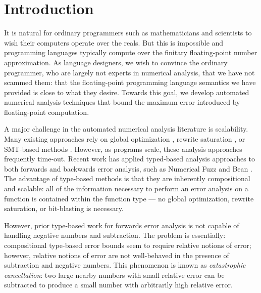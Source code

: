 \section{Introduction}
It is natural for ordinary programmers such as mathematicians and scientists to
wish their computers operate over the reals. 
But this is impossible and programming languages typically compute over the
finitary floating-point number approximation.
As language designers, we wish to convince the ordinary programmer, who are
largely not experts in numerical analysis, that we have not scammed them: that
the floating-point programming language semantics we have provided is close to
what they desire. 
Towards this goal, we develop automated numerical analysis techniques that bound
the maximum error introduced by floating-point computation.

A major challenge in the automated numerical analysis literature is scalability.
Many existing approaches rely on global optimization \cite{fptaylor} \cite{satire},
rewrite saturation \cite{gappa}, or SMT-based methods \cite{rosa}. 
However, as programs scale, these analysis approaches frequently time-out.
Recent work has applied typed-based analysis approaches to both forwards and
backwards error analysis, such as Numerical Fuzz \cite{numfuzz} and Bean \cite{bean}.
The advantage of type-based methods is that they are inherently compositional
and scalable: all of the information necessary to perform an error analysis on a
function is contained within the function type --- no global optimization,
rewrite saturation, or bit-blasting is necessary.

However, prior type-based work for forwards error analysis is not capable of
handling negative numbers and subtraction. The problem is essentially:
compositional type-based error bounds seem to require relative notions of error;
however, relative notions of error are not well-behaved in the presence of
subtraction and negative numbers. This phenomenon is known as
\textit{catastrophic cancellation}: two large nearby numbers with small relative
error can be subtracted to produce a small number with arbitrarily high relative
error. 

